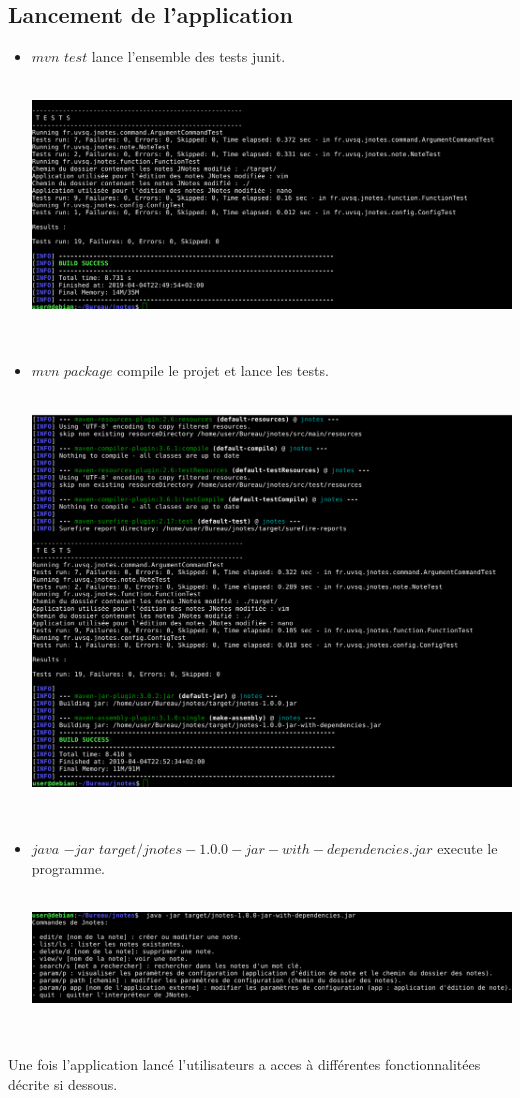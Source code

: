 \documentclass[a4paper,11pt]{article}
\begin{document}
		\subsection{Lancement de l'application}
		\begin{itemize}
				\item $mvn$ $test$ lance l'ensemble des tests junit.\\
				\\
				\centerline{\includegraphics[scale=0.4]{Captures/test.png}}
				\\
				\item $mvn$ $package$ compile le projet et lance les tests.\\
				\\
				\centerline{\includegraphics[scale=0.4]{Captures/mvnpackage.png}}
				\\
				\item $java$ $-jar$ $target/jnotes-1.0.0-jar-with-dependencies.jar$ execute le programme.\\
				\\
				\centerline{\includegraphics[scale=0.4]{Captures/ecranacceuil.png}}
				\\
			\end{itemize}
		Une fois l'application lancé l'utilisateurs a acces à différentes fonctionnalitées décrite si dessous.
\end{document}
